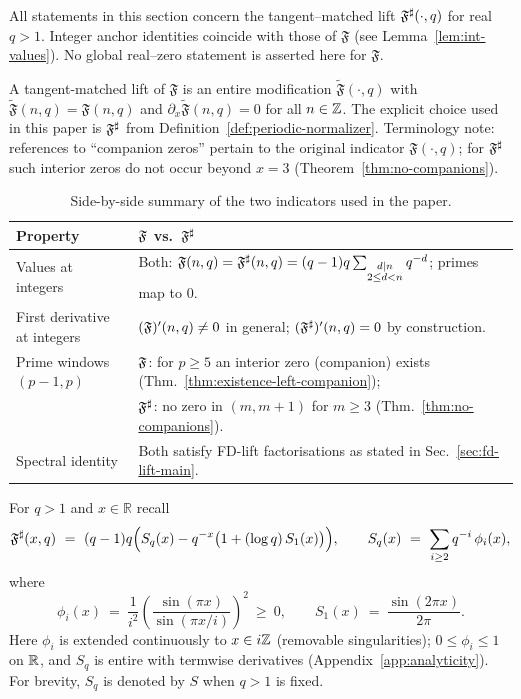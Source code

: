 \begin{remark}\label{rem:scope-fsharp}
All statements in this section concern the tangent–matched lift $\mathfrak F^{\sharp}(\cdot,q)$ for real $q>1$. Integer anchor identities coincide with those of $\mathfrak F$ (see Lemma~\ref{lem:int-values}). No global real–zero statement is asserted here for $\mathfrak F$.
\end{remark}

\begin{definition}\label{def:tangent-matched}
A tangent-matched lift of $\mathfrak F$ is an entire modification $\widetilde{\mathfrak F}(\cdot,q)$ with $\widetilde{\mathfrak F}(n,q)=\mathfrak F(n,q)$ and $\partial_x\widetilde{\mathfrak F}(n,q)=0$ for all $n\in\mathbb{Z}$. The explicit choice used in this paper is $\mathfrak F^{\sharp}$ from Definition~\ref{def:periodic-normalizer}.
Terminology note: references to “companion zeros” pertain to the original indicator $\mathfrak F(\cdot,q)$; for $\mathfrak F^{\sharp}$ such interior zeros do not occur beyond $x=3$ (Theorem~\ref{thm:no-companions}).
\end{definition}

\begin{table}[h]
\small
\centering
\begin{tabular}{ll}
\hline
Property & $\mathfrak F$ vs.\ $\mathfrak F^{\sharp}$ \\
\hline
Values at integers & Both: $\mathfrak F(n,q)=\mathfrak F^{\sharp}(n,q)= (q-1)q\sum_{\substack{d\mid n\\2\le d<n}} q^{-d}$; primes map to $0$. \\
First derivative at integers & $(\mathfrak F)'(n,q)\neq 0$ in general; $(\mathfrak F^{\sharp})'(n,q)=0$ by construction. \\
Prime windows $(p-1,p)$ & $\mathfrak F$: for $p\ge5$ an interior zero (companion) exists (Thm.~\ref{thm:existence-left-companion}); \\
& $\mathfrak F^{\sharp}$: no zero in $(m,m+1)$ for $m\ge3$ (Thm.~\ref{thm:no-companions}). \\
Spectral identity & Both satisfy FD-lift factorisations as stated in Sec.~\ref{sec:fd-lift-main}. \\
\hline
\end{tabular}
\caption{Side-by-side summary of the two indicators used in the paper.}
\label{tab:F-vs-Fsharp}
\end{table}

For $q>1$ and $x\in\mathbb R$ recall
\[
\Fsharp(x,q)\ =\ (q-1)q\Big(S_q(x)-q^{-x}\bigl(1+(\log q)\,S_1(x)\bigr)\Big),
\qquad
S_q(x)\ =\ \sum_{i\ge2} q^{-i}\,\phi_i(x),
\]
where
\[
\phi_i(x)\ =\ \frac{1}{i^2}\left(\frac{\sin(\pi x)}{\sin(\pi x/i)}\right)^2\ \ge\ 0,
\qquad
S_1(x)\ =\ \frac{\sin(2\pi x)}{2\pi}.
\]
Here $\phi_i$ is extended continuously to $x\in i\mathbb{Z}$ (removable singularities); $0\le\phi_i\le1$ on $\mathbb{R}$, and $S_q$ is entire with termwise derivatives (Appendix~\ref{app:analyticity}). For brevity, $S_q$ is denoted by $S$ when $q>1$ is fixed.

